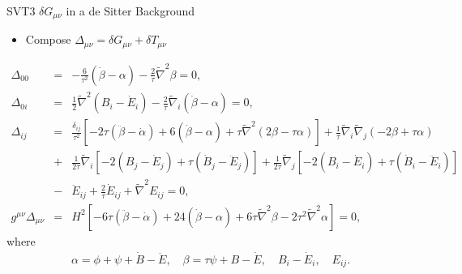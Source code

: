 \documentclass[8pt,aspectratio=1610]{beamer}
\begin{document}

\begin{frame}{SVT3 $\delta G_{\mu\nu}$ in a de Sitter Background}
	\begin{itemize}
		\item Compose $\Delta_{\mu\nu} = \delta G_{\mu\nu} + \delta T_{\mu\nu}$
	\end{itemize}
	\begin{eqnarray}
	\Delta_{00}&=&-\frac{6}{\tau^2}(\dot{\beta}-\alpha)-\frac{2}{\tau}\tilde{\nabla}^2\beta=0,
	\nonumber\\
	\Delta_{0i}&=&\frac{1}{2}\tilde{\nabla}^2(B_i-\dot{E}_i)-\frac{2}{\tau}\tilde{\nabla}_i(\dot{\beta}-\alpha)=0,
	\nonumber\\
	\Delta_{ij}&=&\frac{\delta_{ij}}{\tau^2}\left[-2\tau(\ddot{\beta}-\dot{\alpha})+6(\dot{\beta}-\alpha)+\tau \tilde{\nabla}^2(2\beta-\tau \alpha)\right]
	+\frac{1}{\tau}\tilde{\nabla}_i\tilde{\nabla}_j(-2 \beta +\tau\alpha)
	\nonumber\\
	&+&\frac{1}{2\tau}\tilde{\nabla}_i[-2(B_j-\dot{E}_j)+\tau(\dot{B}_j-\ddot{E}_j)]
	+\frac{1}{2\tau}\tilde{\nabla}_j[-2(B_i-\dot{E}_i)+\tau(\dot{B}_i-\ddot{E}_i)]
	\nonumber\\
	&-&\ddot{E}_{ij}+\frac{2}{\tau}\dot{E}_{ij}+\tilde{\nabla}^2E_{ij}=0,
	\nonumber\\
	g^{\mu\nu}\Delta_{\mu\nu}&=&H^2[-6\tau(\ddot{\beta}-\dot{\alpha})+24(\dot{\beta}-\alpha)
	+6\tau \tilde{\nabla}^2\beta-2\tau^2\tilde{\nabla}^2\alpha]=0,
	\end{eqnarray}
	\hspace{0.06\linewidth}where
	\begin{eqnarray}
	\alpha=\phi+\psi+\dot{B}-\ddot{E} ,\quad \beta=\tau\psi+B-\dot{E}, \quad B_i-\dot{E}_i,\quad E_{ij}.
	\end{eqnarray}
\end{frame}

\end{document}
